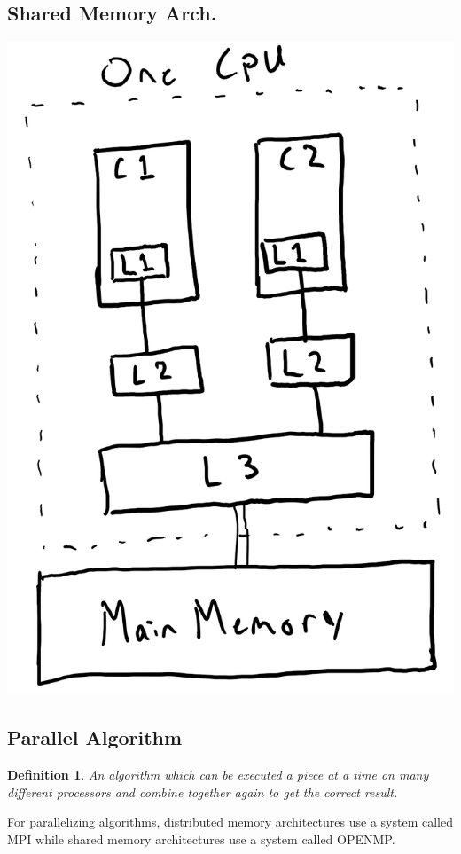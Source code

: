 \documentclass{report}
\newtheorem*{defn}{Definition}
\begin{document}
\subsection{Shared Memory Arch.}
\begin{center}
\includegraphics[scale=0.5]{SharedMemoryArch.png}
\end{center}
\subsection{Parallel Algorithm}
\begin{defn}
An algorithm which can be executed a piece at a time on many different processors and combine together again to get the correct result.
\end{defn}
For parallelizing algorithms, distributed memory architectures use a system called MPI while shared memory architectures use a system called OPENMP.
\end{document}

